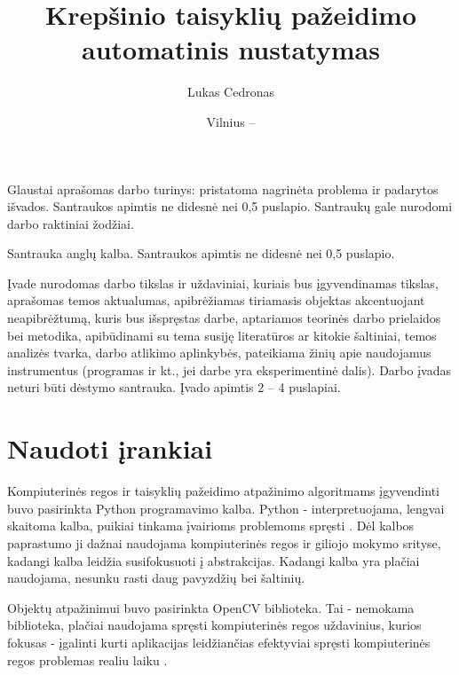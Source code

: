 \documentclass{VUMIFPSbakalaurinis}
\institute{Informatikos institutas}  %
\title{Krepšinio taisyklių pažeidimo automatinis nustatymas}
\author{Lukas Cedronas}
\date{Vilnius – \the\year}
\begin{document}
\maketitle


Glaustai aprašomas darbo turinys: pristatoma nagrinėta problema ir padarytos
išvados. Santraukos apimtis ne didesnė nei 0,5 puslapio. Santraukų gale
nurodomi darbo raktiniai žodžiai. 

Santrauka anglų kalba. Santraukos apimtis ne didesnė nei 0,5 puslapio.

\tableofcontents

Įvade nurodomas darbo tikslas ir uždaviniai, kuriais bus įgyvendinamas tikslas,
aprašomas temos aktualumas, apibrėžiamas tiriamasis objektas akcentuojant
neapibrėžtumą, kuris bus išspręstas darbe, aptariamos teorinės darbo prielaidos
bei metodika, apibūdinami su tema susiję literatūros ar kitokie šaltiniai,
temos analizės tvarka, darbo atlikimo aplinkybės, pateikiama žinių apie
naudojamus instrumentus (programas ir kt., jei darbe yra eksperimentinė dalis).
Darbo įvadas neturi būti dėstymo santrauka. Įvado apimtis 2 -- 4 puslapiai.

\section{Naudoti įrankiai}

Kompiuterinės regos ir taisyklių pažeidimo atpažinimo algoritmams įgyvendinti buvo pasirinkta Python programavimo kalba. Python - interpretuojama, lengvai skaitoma kalba, puikiai tinkama įvairioms problemoms spręsti \cite{Python}. Dėl kalbos paprastumo ji dažnai naudojama kompiuterinės regos ir giliojo mokymo srityse, kadangi kalba leidžia susifokusuoti į abstrakcijas. Kadangi kalba yra plačiai naudojama, nesunku rasti daug pavyzdžių bei šaltinių. 

Objektų atpažinimui buvo pasirinkta OpenCV biblioteka. Tai - nemokama biblioteka, plačiai naudojama spręsti kompiuterinės regos uždavinius, kurios fokusas - įgalinti kurti aplikacijas leidžiančias efektyviai spręsti kompiuterinės regos problemas realiu laiku \cite{BradskiOpenCV}.
\end{document}

